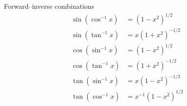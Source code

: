 Forward--inverse combinations
\begin{align*}
    \sin (\cos^{-1} x) &= (1 - x^2)^{1/2} \\
    \sin (\tan^{-1} x) &= x (1 + x^2)^{-1/2} \\
    \cos (\sin^{-1} x) &= (1 - x^2)^{1/2} \\
    \cos (\tan^{-1} x) &= (1 + x^2)^{-1/2} \\
    \tan (\sin^{-1} x) &= x (1 - x^2)^{-1/2} \\
    \tan (\cos^{-1} x) &= x^{-1} (1 - x^2)^{1/2} \\
\end{align*}



